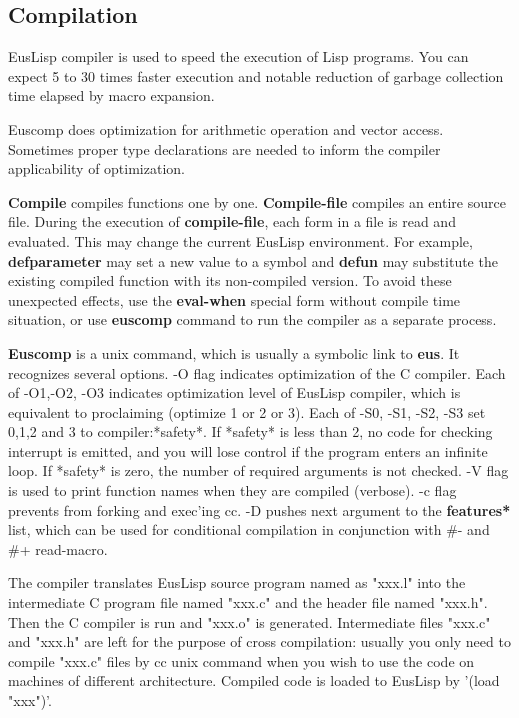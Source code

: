 \begin{refdesc}

\end{refdesc}

\newpage

\subsection{Compilation}\label{compiler}

EusLisp compiler is used to speed the execution of Lisp programs.
You can expect 5 to 30 times faster execution and notable reduction of garbage
collection time elapsed by macro expansion.

Euscomp does optimization for arithmetic operation and vector access.
Sometimes proper type declarations are needed to inform
the compiler applicability of optimization.

{\bf Compile} compiles functions one by one.
{\bf Compile-file}  compiles an entire source file.
During the execution of {\bf compile-file}, each form in a file
is read and evaluated.
This may change the current EusLisp environment.
For example, {\bf defparameter}
may set a new value to a symbol and {\bf defun} may substitute the existing
compiled function with its non-compiled version.
To avoid these unexpected effects, use the {\bf eval-when} special form
without compile time situation,
or use {\bf euscomp} command to run the compiler as a separate process.

{\bf Euscomp} is a unix command, which is usually a symbolic link to {\bf eus}.
It recognizes several options.
-O flag indicates optimization of the C compiler.
Each of -O1,-O2, -O3 indicates optimization level of EusLisp compiler,
which is equivalent to proclaiming (optimize 1 or 2 or 3).
Each of -S0, -S1, -S2, -S3 set 0,1,2 and 3 to compiler:*safety*.
If *safety* is less than 2, no code for checking interrupt is emitted,
and you will lose control if the program enters an infinite loop.
If *safety* is zero, the number of required arguments is not checked.
-V flag is used to print function names when they are compiled (verbose).
-c flag prevents from forking and exec'ing cc.
-D pushes next argument to the {\bf *features*} list, which can be used for
conditional compilation in conjunction with \#- and \#+ read-macro.

The compiler translates EusLisp source program named as "xxx.l" 
into the intermediate C program file named "xxx.c" and the  header file
named "xxx.h".
Then the C compiler is run and "xxx.o" is generated.
Intermediate files "xxx.c" and "xxx.h" are left
for the purpose of cross compilation:
usually you only need to compile "xxx.c" files by cc unix command
when you wish to use the code on machines of different architecture.
Compiled code is loaded to EusLisp by '(load "xxx")'.

